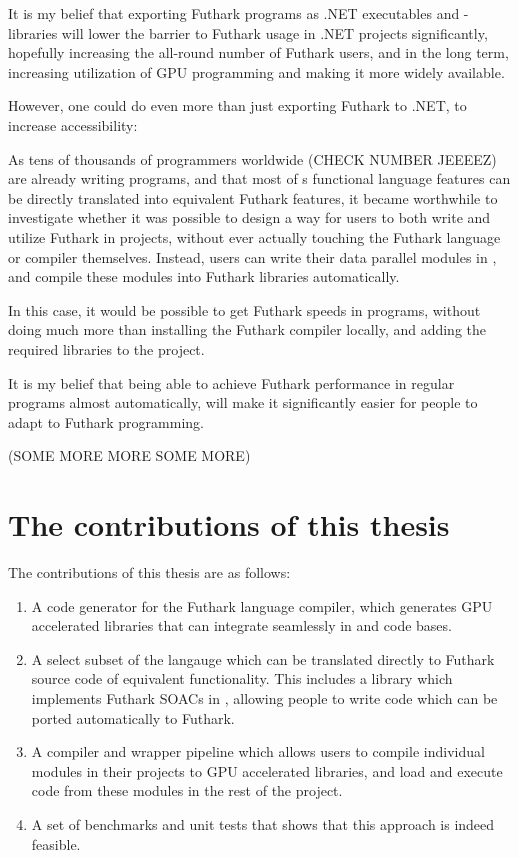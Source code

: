It is my belief that exporting Futhark programs as .NET executables and
-libraries will lower the barrier to Futhark usage in .NET projects
significantly, hopefully increasing the all-round number of Futhark users, and
in the long term, increasing utilization of GPU programming and making it more
widely available.

However, one could do even more than just exporting Futhark to .NET, to increase
accessibility:

As tens of thousands of programmers worldwide (CHECK NUMBER JEEEEZ) are already
writing \fsharp{} programs, and that most of \fsharp{}s functional language features can be
directly translated into equivalent Futhark features, it became worthwhile to
investigate whether it was possible to design a way for users to both write and
utilize Futhark in \fsharp{} projects, without ever actually touching the
Futhark language or compiler themselves.
Instead, users can write their data parallel \fsharp{} modules in \fshark{}, and compile these
modules into Futhark libraries automatically.

In this case, it would be possible to get Futhark speeds in \fsharp{} programs,
without doing much more than installing the Futhark compiler locally, and adding
the required \fshark{} libraries to the \fsharp{} project.

It is my belief that being able to achieve Futhark performance in regular \fsharp{}
programs almost automatically, will make it significantly easier for people to
adapt to Futhark programming.

(SOME MORE MORE SOME MORE)

\clearpage

\section*{The contributions of this thesis}
The contributions of this thesis are as follows:
\begin{enumerate}
\item A \csharp{} code generator for the Futhark language compiler, which
  generates GPU accelerated libraries that can integrate seamlessly in 
  \csharp{} and \fsharp{} code bases.

\item A select subset of the \fsharp{} langauge which can be translated directly to
  Futhark source code of equivalent functionality. This includes a
  library which implements Futhark SOACs\cite{soacs} in \fsharp{}, allowing
  people to write \fsharp{} code which can be ported automatically to Futhark.

\item A compiler and wrapper pipeline which allows users to compile individual
  \fsharp{} modules in their projects to GPU accelerated libraries, and load and
  execute code from these modules in the rest of the \fsharp{} project.

\item A set of benchmarks and unit tests that shows that this approach is indeed feasible.
\end{enumerate}

